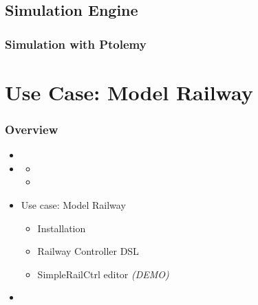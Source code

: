 \subsection[Simulation Engine]{Simulation Engine}
\begin{frame}
  \frametitle{Simulation with Ptolemy}
  \end{frame}



\section*{Use Case: Model Railway}
\begin{frame}
  \frametitle{Overview}
    \begin{itemize}
	      \item {}
	      \item {}
        \begin{itemize}
       	       \item {}
       	       \item {}
        \end{itemize}
	      \item Use case: Model Railway
        \begin{itemize}
	            \item Installation
	            \item Railway Controller DSL
	            \item SimpleRailCtrl editor \emph{(DEMO)}
        \end{itemize}
	      \item {}
    \end{itemize}
\end{frame}


